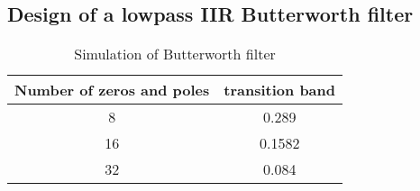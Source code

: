 \documentclass{article}
\begin{document}
\subsection*{Design of a lowpass IIR Butterworth filter}
\begin{table}[h!]
  \begin{center}
    \caption{Simulation of Butterworth filter}
    \label{tab:Frequency vs SNRbd}
    \begin{tabular}{c|c} 
      \textbf{Number of zeros and poles} & \textbf{transition band} \\
      \hline
      8 &  0.289 \\
      16 & 0.1582 \\
      32 & 0.084 \\
    \end{tabular}
  \end{center}
\end{table}
\end{document}
